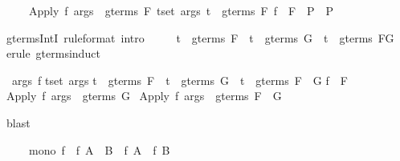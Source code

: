 \begin{isabellebody}
\begin{isamarkuptext}
\begin{isabelle}%
\ \ \ \ \ {\isasymlbrakk}Apply\ f\ args\ {\isasymin}\ gterms\ F{\isacharsemicolon}\ {\isasymlbrakk}{\isasymforall}t{\isasymin}set\ args{\isachardot}\ t\ {\isasymin}\ gterms\ F{\isacharsemicolon}\ f\ {\isasymin}\ F{\isasymrbrakk}\ {\isasymLongrightarrow}\ P{\isasymrbrakk}\ {\isasymLongrightarrow}\ P%
\end{isabelle}
%
\end{isamarkuptext}%
\isamarkupfalse%
\ gterms{\isacharunderscore}IntI\ {\isacharbrackleft}rule{\isacharunderscore}format{\isacharcomma}\ intro{\isacharbang}{\isacharbrackright}{\isacharcolon}\isanewline
\ \ \ \ \ {\isachardoublequote}t\ {\isasymin}\ gterms\ F\ {\isasymLongrightarrow}\ t\ {\isasymin}\ gterms\ G\ {\isasymlongrightarrow}\ t\ {\isasymin}\ gterms\ {\isacharparenleft}F{\isasyminter}G{\isacharparenright}{\isachardoublequote}\isanewline
%
\isadelimproof
%
\endisadelimproof
%
\isatagproof
\isamarkupfalse%
\ {\isacharparenleft}erule\ gterms{\isachardot}induct{\isacharparenright}\isamarkuptrue%
%
\begin{isamarkuptxt}%
\begin{isabelle}%
\ {}{\isachardot}\ {\isasymAnd}args\ f{\isachardot}\isanewline
{}t{\isasymin}set\ args{\isachardot}\isanewline
{}t\ {\isasymin}\ gterms\ F\ {\isasymand}\ {\isacharparenleft}t\ {\isasymin}\ gterms\ G\ {\isasymlongrightarrow}\ t\ {\isasymin}\ gterms\ {\isacharparenleft}F\ {\isasyminter}\ G{\isacharparenright}{\isacharparenright}{\isacharsemicolon}\isanewline
{}f\ {\isasymin}\ F{\isasymrbrakk}\isanewline
{}\ Apply\ f\ args\ {\isasymin}\ gterms\ G\ {\isasymlongrightarrow}\isanewline
{}Apply\ f\ args\ {\isasymin}\ gterms\ {\isacharparenleft}F\ {\isasyminter}\ G{\isacharparenright}%
\end{isabelle}%
\end{isamarkuptxt}%
\isamarkupfalse%
\ blast\isanewline
\isamarkupfalse%
%
\endisatagproof
{\isafoldproof}%
%
\isadelimproof
%
\endisadelimproof
\isamarkuptrue%
%
\begin{isamarkuptext}%
\begin{isabelle}%
\ \ \ \ \ mono\ f\ {\isasymLongrightarrow}\ f\ {\isacharparenleft}A\ {\isasyminter}\ B{\isacharparenright}\ {\isasymsubseteq}\ f\ A\ {\isasyminter}\ f\ B%

\end{isabelle}
\end{isamarkuptext}
\end{isabellebody}
